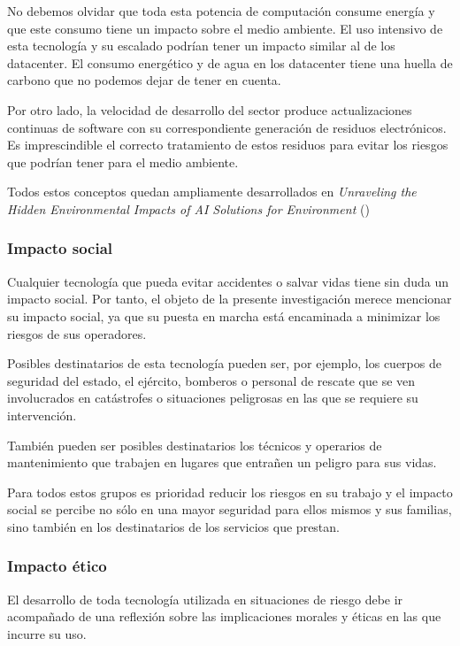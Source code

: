 \documentclass[a4paper, 12pt, spanish, twoside]{article}
\begin{document}
No debemos olvidar que toda esta potencia de computación consume energía y que este consumo tiene un impacto sobre el medio ambiente. El uso intensivo de esta tecnología y su escalado podrían tener un impacto similar al de los datacenter. El consumo energético y de agua en los datacenter tiene una huella de carbono que no podemos dejar de tener en cuenta. 

Por otro lado, la velocidad de desarrollo del sector produce actualizaciones continuas de software con su correspondiente generación de residuos electrónicos. Es imprescindible el correcto tratamiento de estos residuos para evitar los riesgos que podrían tener para el medio ambiente. 

Todos estos conceptos quedan ampliamente desarrollados en \textit{Unraveling the Hidden Environmental Impacts of AI Solutions for Environment} (\cite{LLB+1}) 


\subsubsection{Impacto social} \label{sec:anexo1:social} 

Cualquier tecnología que pueda evitar accidentes o salvar vidas tiene sin duda un impacto social. Por tanto, el objeto de la presente investigación merece mencionar su impacto social, ya que su puesta en marcha está encaminada a minimizar los riesgos de sus operadores.  

Posibles destinatarios de esta tecnología pueden ser, por ejemplo, los cuerpos de seguridad del estado, el ejército, bomberos o personal de rescate que se ven involucrados en catástrofes o situaciones peligrosas en las que se requiere su intervención. 

También pueden ser posibles destinatarios los técnicos y operarios de mantenimiento que trabajen en lugares que entrañen un peligro para sus vidas. 

Para todos estos grupos es prioridad reducir los riesgos en su trabajo y el impacto social se percibe no sólo en una mayor seguridad para ellos mismos y sus familias, sino también en los destinatarios de los servicios que prestan. 


\subsubsection{Impacto ético} \label{sec:anexo1:etico} 

El desarrollo de toda tecnología utilizada en situaciones de riesgo debe ir acompañado de una reflexión sobre las implicaciones morales y éticas en las que incurre su uso.  
\end{document}
